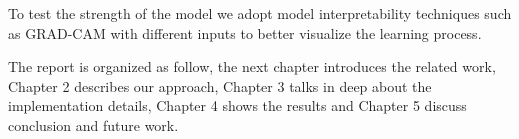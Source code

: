 \documentclass[../document.tex]{subfiles}
\begin{document}
To test the strength of the model we adopt model interpretability techniques such as GRAD-CAM with different inputs to better visualize the learning process.

The report is organized as follow, the next chapter introduces the related work, Chapter 2 describes our approach, Chapter 3 talks in deep about the implementation details,
Chapter 4 shows the results and Chapter 5 discuss conclusion and future work.
\end{document}
